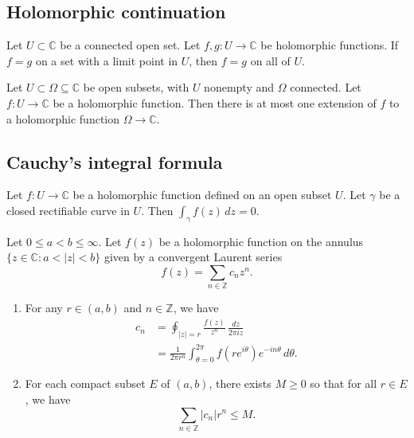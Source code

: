 \documentclass[reqno]{amsart}  \numberwithin{theorem}{section} \numberwithin{equation}{section}
\begin{document}
\subsection{Holomorphic continuation}

\begin{theorem}
  Let $U \subset \mathbb{C} $ be a connected open set.  Let $f, g : U \rightarrow \mathbb{C} $ be holomorphic functions.  If $f = g$ on a set with a limit point in $U$, then $f = g$ on all of $U$.
\end{theorem}
\begin{corollary}\label{corollary:cj3vqbthht}
  Let $U \subset \Omega \subseteq \mathbb{C} $ be open subsets, with $U$ nonempty and $\Omega$ connected.  Let $f : U \rightarrow \mathbb{C}$ be a holomorphic function.  Then there is at most one extension of $f$ to a holomorphic function $\Omega \rightarrow \mathbb{C}$.
\end{corollary}

\subsection{Cauchy's integral formula}
\begin{theorem}
  Let $f : U \rightarrow \mathbb{C} $ be a holomorphic function defined on an open subset $U$.  Let $\gamma$ be a closed rectifiable curve in $U$.  Then $\int_\gamma f(z) \, d z = 0$.
\end{theorem}

\begin{theorem}\label{theorem:cj3vqbjd26}
  Let $0 \leq a < b \leq \infty$.  Let $f(z)$ be a holomorphic function on the annulus $\{z \in \mathbb{C} : a < \lvert z \rvert < b\}$ given by a convergent Laurent series
  \begin{equation*}
    f(z) = \sum_{n \in \mathbb{Z} } c_n z^n.
  \end{equation*}
  \begin{enumerate}
  \item For any $r \in (a,b)$ and $n \in \mathbb{Z}$, we have
    \begin{align*}
      c_n &=  \oint_{\lvert z \rvert = r} \frac{f(z)}{z^{n}} \, \frac{d z}{2 \pi i z} \\
          &= \frac{1}{2 \pi r^n } \int_{\theta = 0 }^{2 \pi } f (r e^{i \theta }) e^{- i n \theta } \,d \theta.
    \end{align*}
  \item For each compact subset $E$ of $(a,b)$, there exists $M \geq 0$ so that for all $r \in E$, we have
    \begin{equation}\label{eq:cj3vqbiupy}
      \sum_{n \in \mathbb{Z}} \lvert c_n \rvert r^n \leq M.
    \end{equation}
  \end{enumerate}
\end{theorem}
\end{document}

